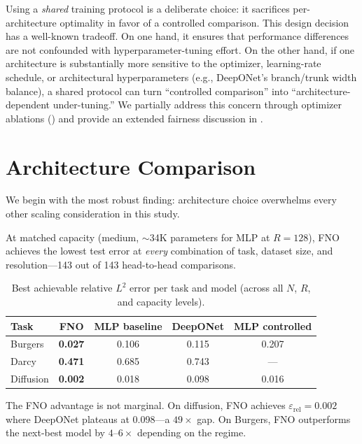 \documentclass[11pt]{article}
\newcommand{\relLtwo}{\varepsilon_{\mathrm{rel}}}
\begin{document}
\noindent
Using a \emph{shared} training protocol is a deliberate choice:
it sacrifices per-architecture optimality in favor of a controlled
comparison. This design decision has a well-known tradeoff.
On one hand, it ensures that performance differences are not
confounded with hyperparameter-tuning effort. On the other hand,
if one architecture is substantially more sensitive to the optimizer,
learning-rate schedule, or architectural hyperparameters (e.g.,
DeepONet's branch/trunk width balance), a shared protocol can
turn ``controlled comparison'' into ``architecture-dependent
under-tuning.''
We partially address this concern through optimizer ablations
() and provide an extended fairness discussion
in .


\section{Architecture Comparison}
\label{sec:architecture}

We begin with the most robust finding: architecture choice overwhelms
every other scaling consideration in this study.

At matched capacity (medium, $\sim$34K parameters for MLP at
$R = 128$), FNO achieves the lowest test error at \emph{every}
combination of task, dataset size, and resolution---143 out of 143
head-to-head comparisons.

\begin{table}[h]
\centering
\caption{Best achievable relative $L^2$ error per task and model
(across all $N$, $R$, and capacity levels).}
\label{tab:best-error}
\begin{tabular}{@{}lcccc@{}}
\toprule
\textbf{Task} & \textbf{FNO} & \textbf{MLP baseline} &
\textbf{DeepONet} & \textbf{MLP controlled} \\
\midrule
Burgers   & \textbf{0.027} & 0.106 & 0.115 & 0.207 \\
Darcy     & \textbf{0.471} & 0.685 & 0.743 & --- \\
Diffusion & \textbf{0.002} & 0.018 & 0.098 & 0.016 \\
\bottomrule
\end{tabular}
\end{table}

The FNO advantage is not marginal. On diffusion, FNO achieves
$\relLtwo = 0.002$ where DeepONet plateaus at 0.098---a $49\times$
gap. On Burgers, FNO outperforms the next-best model by
$4$--$6\times$ depending on the regime.
\end{document}
